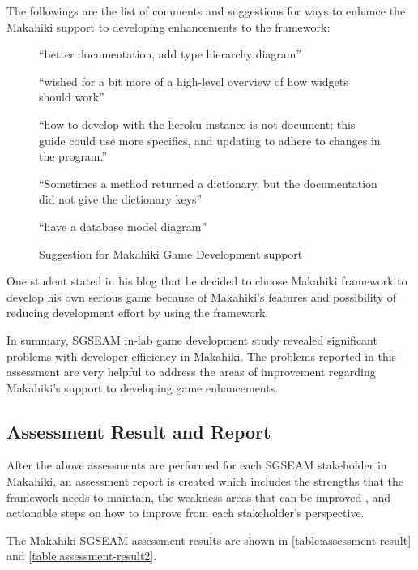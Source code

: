 The followings are the list of comments and suggestions for ways to enhance the Makahiki support to developing enhancements to the framework:

\begin{figure}[ht!]
\begin{mybox}
\begin{compactenum}
	\item ``better documentation, add type hierarchy diagram''
	\item ``wished for a bit more of a high-level overview of how widgets should work''
	\item ``how to develop with the heroku instance is not document; this guide could use more specifics, and updating to adhere to changes in the program.''
	\item ``Sometimes a method returned a dictionary, but the documentation did not give the dictionary keys''
	\item ``have a database model diagram''
\end{compactenum}
\end{mybox}
\caption{Suggestion for Makahiki Game Development support}
\label{fig:develop-suggestion}  
\end{figure}

One student stated in his blog that he decided to choose Makahiki
framework to develop his own serious game because of Makahiki's features and possibility
of reducing development effort by using the framework. 

In summary, SGSEAM in-lab game development study revealed significant problems with developer efficiency in Makahiki. The problems reported in this assessment are very helpful to address the areas of improvement regarding Makahiki's support to developing game enhancements.

\subsection{Assessment Result and Report}

After the above assessments are performed for each SGSEAM stakeholder in Makahiki, an assessment report is created which includes the strengths that the framework needs to maintain, the weakness areas that can be improved , and actionable steps on how to improve from each stakeholder's perspective. 

The Makahiki SGSEAM assessment results are shown in \autoref{table:assessment-result} and  \autoref{table:assessment-result2}.

